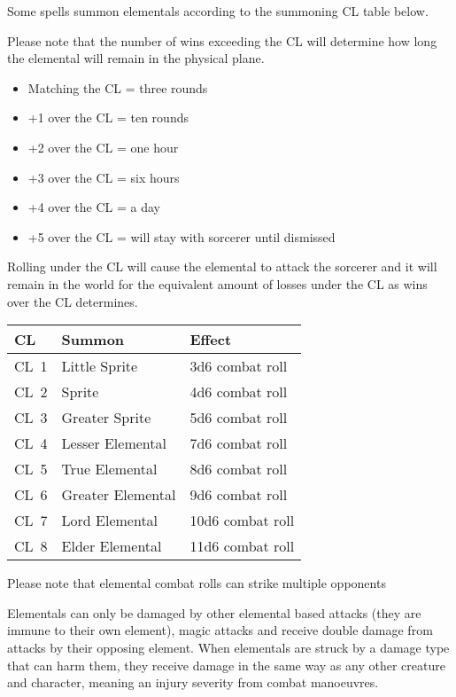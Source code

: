 Some spells summon elementals according to the summoning CL table below.

Please note that the number of wins exceeding the CL will determine how long the elemental will remain in the physical plane.

\begin{itemize}
    \item Matching the CL = three rounds
    \item +1 over the CL = ten rounds
    \item +2 over the CL = one hour
    \item +3 over the CL = six hours
    \item +4 over the CL = a day
    \item +5 over the CL = will stay with sorcerer until dismissed
\end{itemize}

Rolling under the CL will cause the elemental to attack the sorcerer and it will remain in the world for the equivalent amount of losses under the CL as wins over the CL determines.

\begin{center}
    \begin{tabular}{|l l l|} 
      \hline
      \textbf{CL} & \textbf{Summon} & \textbf{Effect} \\ 
      \hline
      CL~1 & Little Sprite & 3d6 combat roll \\ 
      CL~2 & Sprite & 4d6 combat roll \\ 
      CL~3 & Greater Sprite & 5d6 combat roll \\ 
      CL~4 & Lesser Elemental & 7d6 combat roll \\ 
      CL~5 & True Elemental & 8d6 combat roll \\ 
      CL~6 & Greater Elemental & 9d6 combat roll \\ 
      CL~7 & Lord Elemental & 10d6 combat roll \\ 
      CL~8 & Elder Elemental & 11d6 combat roll \\ 
      \hline
    \end{tabular}
\end{center}

Please note that elemental combat rolls can strike multiple opponents

Elementals can only be damaged by other elemental based attacks (they are immune to their own element), magic attacks and receive double damage from attacks by their opposing element. When elementals are struck by a damage type that can harm them, they receive damage in the same way as any other creature and character, meaning an injury severity from combat manoeuvres.

